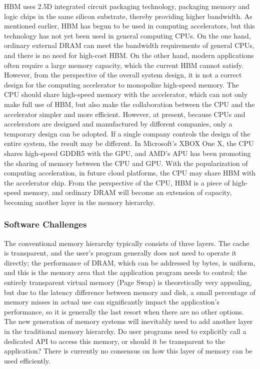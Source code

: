 HBM uses 2.5D integrated circuit packaging technology, packaging memory and logic chips in the same silicon substrate, thereby providing higher bandwidth. As mentioned earlier, HBM has begun to be used in computing accelerators, but this technology has not yet been used in general computing CPUs. On the one hand, ordinary external DRAM can meet the bandwidth requirements of general CPUs, and there is no need for high-cost HBM. On the other hand, modern applications often require a large memory capacity, which the current HBM cannot satisfy. However, from the perspective of the overall system design, it is not a correct design for the computing accelerator to monopolize high-speed memory. The CPU should share high-speed memory with the accelerator, which can not only make full use of HBM, but also make the collaboration between the CPU and the accelerator simpler and more efficient. However, at present, because CPUs and accelerators are designed and manufactured by different companies, only a temporary design can be adopted. If a single company controls the design of the entire system, the result may be different. In Microsoft's XBOX One X, the CPU shares high-speed GDDR5 with the GPU, and AMD's APU has been promoting the sharing of memory between the CPU and GPU. With the popularization of computing acceleration, in future cloud platforms, the CPU may share HBM with the accelerator chip. From the perspective of the CPU, HBM is a piece of high-speed memory, and ordinary DRAM will become an extension of capacity, becoming another layer in the memory hierarchy.

\subsubsection{Software Challenges}

The conventional memory hierarchy typically consists of three layers. The cache is transparent, and the user's program generally does not need to operate it directly; the performance of DRAM, which can be addressed by bytes, is uniform, and this is the memory area that the application program needs to control; the entirely transparent virtual memory (Page Swap) is theoretically very appealing, but due to the latency difference between memory and disk, a small percentage of memory misses in actual use can significantly impact the application's performance, so it is generally the last resort when there are no other options. The new generation of memory systems will inevitably need to add another layer in the traditional memory hierarchy. Do user programs need to explicitly call a dedicated API to access this memory, or should it be transparent to the application? There is currently no consensus on how this layer of memory can be used efficiently.

